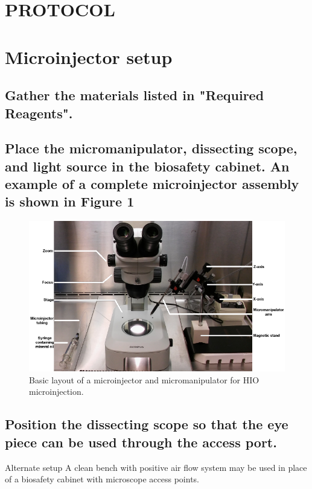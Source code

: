 \documentclass[11pt]{article}
\begin{document}
\section*{PROTOCOL}
\section{{\sffamily } Microinjector setup}
\label{sec:orgheadline10}
\subsection{{\sffamily } Gather the materials listed in "Required Reagents".}
\label{sec:orgheadline1}
\subsection{{\sffamily } Place the micromanipulator, dissecting scope, and light source in the biosafety cabinet. An example of a complete microinjector assembly is shown in \textbf{Figure 1}}
\label{sec:orgheadline2}
\begin{figure}
\centering
\includegraphics[width=0.9\linewidth]{./img/figure1.pdf}
\caption{Basic layout of a microinjector and micromanipulator for HIO microinjection.}
\end{figure}
\subsection{{\sffamily } Position the dissecting scope so that the eye piece can be used through the access port.}
\label{sec:orgheadline3}
\begin{bclogo}[logo=\bcinfo, couleurBarre=Black, noborder=true, couleur=gray!10]{     Alternate setup}
A clean bench with positive air flow system may be used in place of a biosafety cabinet with microscope access points.\\
\end{bclogo}
\end{document}
